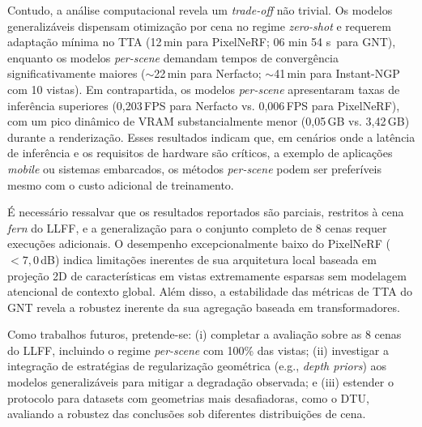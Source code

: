 \documentclass[12pt]{article}
\begin{document}
Contudo, a análise computacional revela um \textit{trade-off} não trivial. Os modelos generalizáveis dispensam otimização por cena no regime \textit{zero-shot} e requerem adaptação mínima no TTA (12\,min para PixelNeRF; 06 min 54 s\ para GNT), enquanto os modelos \textit{per-scene} demandam tempos de convergência significativamente maiores ($\sim$22\,min para Nerfacto; $\sim$41\,min para Instant-NGP com 10 vistas). Em contrapartida, os modelos \textit{per-scene} apresentaram taxas de inferência superiores (0{,}203\,FPS para Nerfacto vs. 0{,}006\,FPS para PixelNeRF), com um pico dinâmico de VRAM substancialmente menor (0{,}05\,GB vs. 3{,}42\,GB) durante a renderização. Esses resultados indicam que, em cenários onde a latência de inferência e os requisitos de hardware são críticos, a exemplo de aplicações \textit{mobile} ou sistemas embarcados, os métodos \textit{per-scene} podem ser preferíveis mesmo com o custo adicional de treinamento.

É necessário ressalvar que os resultados reportados são parciais, restritos à cena \textit{fern} do LLFF, e a generalização para o conjunto completo de 8 cenas requer execuções adicionais. O desempenho excepcionalmente baixo do PixelNeRF ($< 7{,}0$\,dB) indica limitações inerentes de sua arquitetura local baseada em projeção 2D de características em vistas extremamente esparsas sem modelagem atencional de contexto global. Além disso, a estabilidade das métricas de TTA do GNT revela a robustez inerente da sua agregação baseada em transformadores.

Como trabalhos futuros, pretende-se: (i) completar a avaliação sobre as 8 cenas do LLFF, incluindo o regime \textit{per-scene} com 100\% das vistas; (ii) investigar a integração de estratégias de regularização geométrica (e.g., \textit{depth priors}) aos modelos generalizáveis para mitigar a degradação observada; e (iii) estender o protocolo para datasets com geometrias mais desafiadoras, como o DTU, avaliando a robustez das conclusões sob diferentes distribuições de cena.

\newpage


\end{document}
